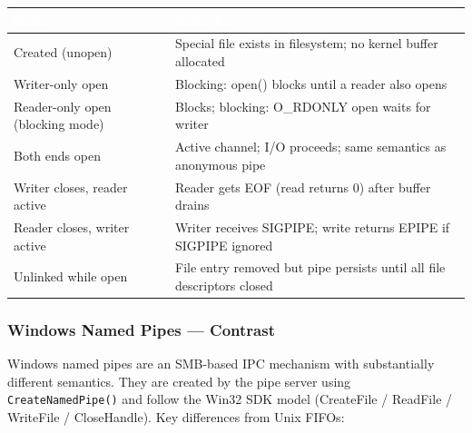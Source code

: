 \documentclass[11pt,letterpaper]{article}
\newcommand{\tableheader}[1]{\textbf{\sffamily\textcolor{white}{#1}}}
\begin{document}
\begin{center}
\begin{tabularx}{\textwidth}{L{3.5cm}X}
\toprule
{}
\tableheader{State} & \tableheader{Behavior} \\
\midrule
Created (unopen) & Special file exists in filesystem; no kernel buffer allocated \\
Writer-only open & Blocking: open() blocks until a reader also opens \\
Reader-only open (blocking mode) & Blocks; blocking: O\_RDONLY open waits for writer \\
Both ends open & Active channel; I/O proceeds; same semantics as anonymous pipe \\
Writer closes, reader active & Reader gets EOF (read returns 0) after buffer drains \\
Reader closes, writer active & Writer receives SIGPIPE; write returns EPIPE if SIGPIPE ignored \\
Unlinked while open & File entry removed but pipe persists until all file descriptors closed \\
\bottomrule
\end{tabularx}
\end{center}

\subsubsection{Windows Named Pipes --- Contrast}

Windows named pipes are an SMB-based IPC mechanism with substantially different semantics. They are created by the pipe server using \texttt{CreateNamedPipe()} and follow the Win32 SDK model (CreateFile / ReadFile / WriteFile / CloseHandle). Key differences from Unix FIFOs:
\end{document}
